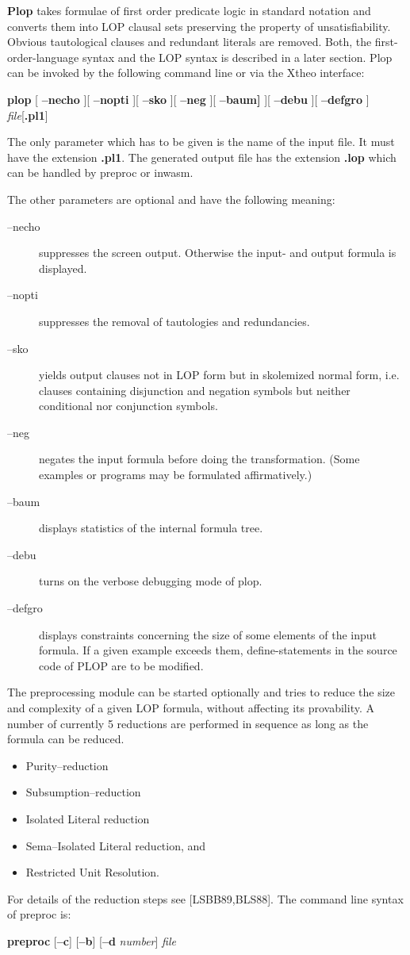 {\bf Plop} 
takes formulae of first order predicate logic in standard notation
and converts them into LOP clausal sets preserving the property
of unsatisfiability. Obvious tautological clauses and redundant
literals are removed. 
Both, the first-order-language syntax and the LOP syntax is described in
a later section. Plop can be invoked by the following command line or via
the Xtheo interface:
\begin{center}
{\bf plop} [ {\bf --necho} ][ {\bf --nopti} ][
{\bf --sko} ][ {\bf --neg} ][ {\bf --baum]} ][
{\bf --debu} ][ {\bf --defgro} ] {\it file\/}[{\bf .pl1}]
\end{center}
The only parameter which has to be given is the name of the input file.
It must have the extension {\bf .pl1}. The generated output file
has the extension {\bf .lop} which can be handled by preproc or inwasm.

The other parameters are optional and have the following meaning:
\begin{description}
\item[--necho]
suppresses the screen output. 
Otherwise the input- and output formula is displayed.
\item[--nopti]
suppresses the removal of tautologies and redundancies. 
\item[--sko]
yields output clauses not in LOP form but in skolemized
normal form, i.e. clauses containing disjunction
and negation symbols but neither conditional nor conjunction
symbols.
\item[--neg]
negates the input formula before doing the transformation.
(Some examples or programs may be formulated affirmatively.)
\item[--baum]
displays statistics of the internal formula tree.
\item[--debu]
turns on the verbose debugging mode of plop.
\item[--defgro]
displays constraints concerning the size of some elements
of the input formula. If a given example exceeds them, define-statements
in the source code of PLOP are to be modified.
\end{description}

The preprocessing module can be started optionally and tries to reduce
the size and complexity of a given LOP formula, without affecting
its provability. A number of currently 5 reductions are performed in
sequence as long as the formula can be reduced. 
\begin{itemize}
\item Purity--reduction
\item Subsumption--reduction
\item Isolated Literal reduction
\item Sema--Isolated Literal reduction, and
\item Restricted Unit Resolution.
\end{itemize}
For details of the reduction steps see [LSBB89,BLS88].
The command line syntax of preproc is:
\begin{center}
{\bf preproc}
[{\bf --c}]
[{\bf --b}]
[{\bf --d} {\it number}]
{\it file}
\end{center}

